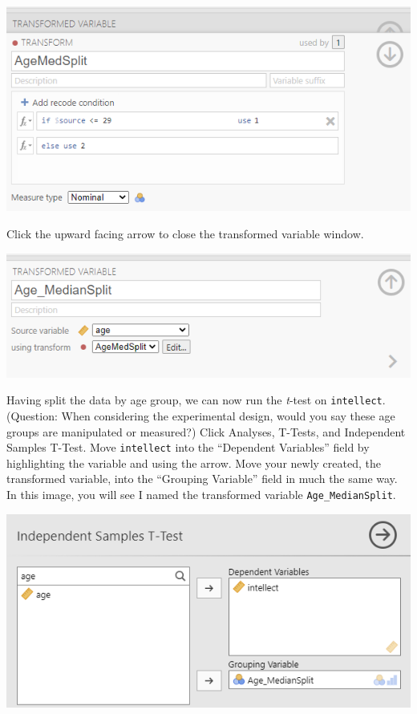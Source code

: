 \documentclass[
]{book}
\begin{document}
\includegraphics{img/ClosingTransformationWindow1.png}

Click the upward facing arrow to close the transformed variable window.

\includegraphics{img/ClosingTransformationWindow2.png}

Having split the data by age group, we can now run the \emph{t}-test on \texttt{intellect}. (Question: When considering the experimental design, would you say these age groups are manipulated or measured?) Click {Analyses}, {T-Tests}, and {Independent Samples T-Test}. Move \texttt{intellect} into the ``Dependent Variables'' field by highlighting the variable and using the arrow. Move your newly created, the transformed variable, into the ``Grouping Variable'' field in much the same way. In this image, you will see I named the transformed variable \texttt{Age\_MedianSplit}.

\includegraphics{img/IndependTTestWithMedSplit.png}
\end{document}
